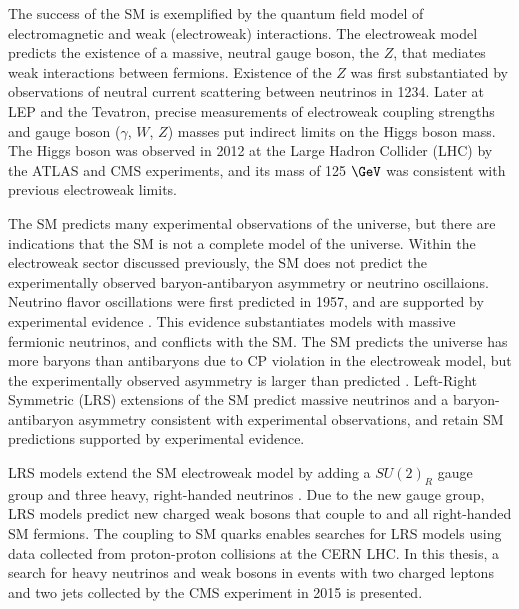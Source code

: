 The success of the SM is exemplified by the quantum field model of electromagnetic and weak (electroweak) 
interactions.  The electroweak model predicts the existence of a massive, neutral gauge boson, the $Z$, 
that mediates weak interactions between fermions.  Existence of the $Z$ was first substantiated by 
observations of neutral current scattering between neutrinos \cite{nuScattering} in 1234.  Later at 
LEP and the Tevatron, precise measurements of electroweak coupling strengths and gauge boson ($\gamma$, $W$, $Z$) 
masses put indirect limits on the Higgs boson mass.  The Higgs boson was observed in 2012 at the Large Hadron Collider 
(LHC) by the ATLAS and CMS experiments, and its mass\cite{combinedHiggsResult} of 125 $\GeV$ was consistent 
with previous electroweak limits.

The SM predicts many experimental observations of the universe, but there are indications that the SM is 
not a complete model of the universe.  Within the electroweak sector discussed previously, the SM does 
not predict the experimentally observed baryon-antibaryon asymmetry or neutrino oscillaions.  Neutrino flavor 
oscillations were first predicted in 1957, and are supported by experimental evidence 
\cite{kamiokandeTwo,solarNuSummary,NOvAresults,mainzPhaseIIResults,t2kResults}.  This evidence substantiates 
models with massive fermionic neutrinos, and conflicts with the SM.  The SM predicts the universe has more 
baryons than antibaryons due to CP violation in the electroweak model, but the experimentally observed 
asymmetry is larger than predicted \cite{surveyOfExtensions}.  Left-Right Symmetric (LRS) extensions of 
the SM predict massive neutrinos and a baryon-antibaryon asymmetry consistent with experimental observations, 
and retain SM predictions supported by experimental evidence.

LRS models extend the SM electroweak model by adding a $SU(2)_{R}$ gauge group and three heavy, right-handed 
neutrinos \nul.  Due to the new gauge group, LRS models predict new charged weak bosons \WR that couple to 
\nul and all right-handed SM fermions.  The \WR coupling to SM quarks enables searches for LRS models using 
data collected from proton-proton collisions at the CERN LHC.  In this thesis, a search for heavy neutrinos \nul 
and weak bosons \WR in events with two charged leptons and two jets collected by the CMS experiment in 2015 
is presented.


